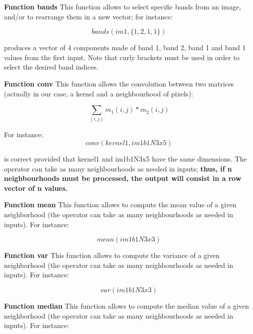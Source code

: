 \textbf{Function bands} \newline
This function allows to select specific bands from an image, and/or to rearrange them in a new vector; for instance:

\begin{equation}
  bands(im1,\{1,2,1,1\})
\end{equation}

produces a vector of 4 components made of band 1, band 2, band 1 and band 1 values from the first input. Note that curly brackets must be used in order to select the desired band indices.

\textbf{Function conv } \newline
This function allows the convolution between two matrices (actually in our case, a kernel and a neighbourhood of pixels):

\begin{equation}
\sum_{(i,j)} m_1(i,j)*m_2(i,j)
\end{equation}

For instance: 
\begin{equation}
  conv(kernel1,im1b1N3x5)
\end{equation}

is correct provided that kernel1 and im1b1N3x5 have the same dimensions. The operator can take as many neighbourhoods as needed in inputs; \textbf{thus, if n neighbourhoods must be processed, the output will consist in a row vector of n values.} 

\textbf{Function mean} \newline
This function allows to compute the mean value of a given neighborhood (the operator can take
as many neighbourhoods as needed in inputs). For instance:

\begin{equation}
	mean(im1b1N3x3)
\end{equation}

\textbf{Function var} \newline
This function allows to compute the variance of a given neighborhood (the operator can take
as many neighbourhoods as needed in inputs). For instance:

\begin{equation}
	var(im1b1N3x3)
\end{equation} 

\textbf{Function median} \newline
This function allows to compute the median value of a given neighborhood (the operator can take
as many neighbourhoods as needed in inputs). For instance:

